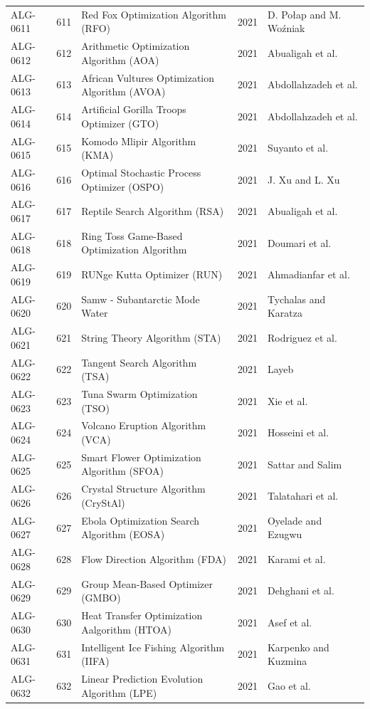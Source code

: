 \documentclass[8pt]{article}
\begin{document}
\begin{landscape}
\begin{longtable}{P{1.7cm}rP{10.0cm}rP{7.2cm}}
ALG-0611 & 611 & Red Fox Optimization Algorithm (RFO) & 2021 & D. Połap and M. Woźniak \\
ALG-0612 & 612 & Arithmetic Optimization Algorithm (AOA) & 2021 & Abualigah et al. \\
ALG-0613 & 613 & African Vultures Optimization Algorithm (AVOA) & 2021 & Abdollahzadeh et al. \\
ALG-0614 & 614 & Artificial Gorilla Troops Optimizer (GTO) & 2021 & Abdollahzadeh et al. \\
ALG-0615 & 615 & Komodo Mlipir Algorithm (KMA) & 2021 & Suyanto et al. \\
ALG-0616 & 616 & Optimal Stochastic Process Optimizer (OSPO) & 2021 & J. Xu and L. Xu \\
ALG-0617 & 617 & Reptile Search Algorithm (RSA) & 2021 & Abualigah et al. \\
ALG-0618 & 618 & Ring Toss Game-Based Optimization Algorithm & 2021 & Doumari et al. \\
ALG-0619 & 619 & RUNge Kutta Optimizer (RUN) & 2021 & Ahmadianfar et al. \\
ALG-0620 & 620 & Samw - Subantarctic Mode Water & 2021 & Tychalas and Karatza \\
ALG-0621 & 621 & String Theory Algorithm (STA) & 2021 & Rodriguez et al. \\
ALG-0622 & 622 & Tangent Search Algorithm (TSA) & 2021 & Layeb \\
ALG-0623 & 623 & Tuna Swarm Optimization (TSO) & 2021 & Xie et al. \\
ALG-0624 & 624 & Volcano Eruption Algorithm (VCA) & 2021 & Hosseini et al. \\
ALG-0625 & 625 & Smart Flower Optimization Algorithm (SFOA) & 2021 & Sattar and Salim \\
ALG-0626 & 626 & Crystal Structure Algorithm (CryStAl) & 2021 & Talatahari et al. \\
ALG-0627 & 627 & Ebola Optimization Search Algorithm (EOSA) & 2021 & Oyelade and Ezugwu \\
ALG-0628 & 628 & Flow Direction Algorithm (FDA) & 2021 & Karami et al. \\
ALG-0629 & 629 & Group Mean-Based Optimizer (GMBO) & 2021 & Dehghani et al. \\
ALG-0630 & 630 & Heat Transfer Optimization Aalgorithm (HTOA) & 2021 & Asef et al. \\
ALG-0631 & 631 & Intelligent Ice Fishing Algorithm (IIFA) & 2021 & Karpenko and Kuzmina \\
ALG-0632 & 632 & Linear Prediction Evolution Algorithm (LPE) & 2021 & Gao et al. \\

\end{longtable}
\end{landscape}
\end{document}
